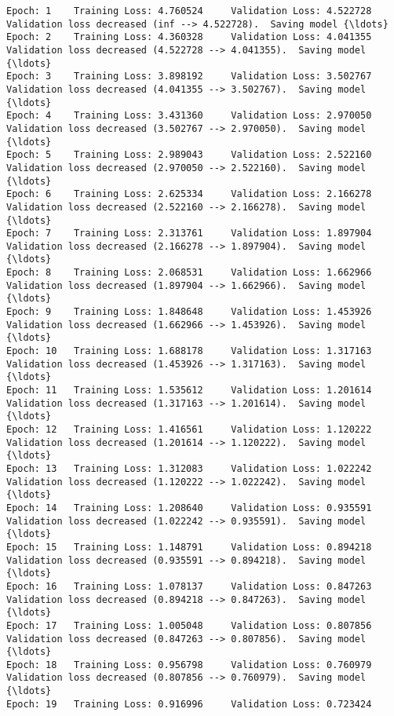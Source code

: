 \documentclass[11pt]{article}
\begin{document}
    \begin{Verbatim}[commandchars=\\\{\}]
Epoch: 1 	Training Loss: 4.760524 	Validation Loss: 4.522728
Validation loss decreased (inf --> 4.522728).  Saving model {\ldots}
Epoch: 2 	Training Loss: 4.360328 	Validation Loss: 4.041355
Validation loss decreased (4.522728 --> 4.041355).  Saving model {\ldots}
Epoch: 3 	Training Loss: 3.898192 	Validation Loss: 3.502767
Validation loss decreased (4.041355 --> 3.502767).  Saving model {\ldots}
Epoch: 4 	Training Loss: 3.431360 	Validation Loss: 2.970050
Validation loss decreased (3.502767 --> 2.970050).  Saving model {\ldots}
Epoch: 5 	Training Loss: 2.989043 	Validation Loss: 2.522160
Validation loss decreased (2.970050 --> 2.522160).  Saving model {\ldots}
Epoch: 6 	Training Loss: 2.625334 	Validation Loss: 2.166278
Validation loss decreased (2.522160 --> 2.166278).  Saving model {\ldots}
Epoch: 7 	Training Loss: 2.313761 	Validation Loss: 1.897904
Validation loss decreased (2.166278 --> 1.897904).  Saving model {\ldots}
Epoch: 8 	Training Loss: 2.068531 	Validation Loss: 1.662966
Validation loss decreased (1.897904 --> 1.662966).  Saving model {\ldots}
Epoch: 9 	Training Loss: 1.848648 	Validation Loss: 1.453926
Validation loss decreased (1.662966 --> 1.453926).  Saving model {\ldots}
Epoch: 10 	Training Loss: 1.688178 	Validation Loss: 1.317163
Validation loss decreased (1.453926 --> 1.317163).  Saving model {\ldots}
Epoch: 11 	Training Loss: 1.535612 	Validation Loss: 1.201614
Validation loss decreased (1.317163 --> 1.201614).  Saving model {\ldots}
Epoch: 12 	Training Loss: 1.416561 	Validation Loss: 1.120222
Validation loss decreased (1.201614 --> 1.120222).  Saving model {\ldots}
Epoch: 13 	Training Loss: 1.312083 	Validation Loss: 1.022242
Validation loss decreased (1.120222 --> 1.022242).  Saving model {\ldots}
Epoch: 14 	Training Loss: 1.208640 	Validation Loss: 0.935591
Validation loss decreased (1.022242 --> 0.935591).  Saving model {\ldots}
Epoch: 15 	Training Loss: 1.148791 	Validation Loss: 0.894218
Validation loss decreased (0.935591 --> 0.894218).  Saving model {\ldots}
Epoch: 16 	Training Loss: 1.078137 	Validation Loss: 0.847263
Validation loss decreased (0.894218 --> 0.847263).  Saving model {\ldots}
Epoch: 17 	Training Loss: 1.005048 	Validation Loss: 0.807856
Validation loss decreased (0.847263 --> 0.807856).  Saving model {\ldots}
Epoch: 18 	Training Loss: 0.956798 	Validation Loss: 0.760979
Validation loss decreased (0.807856 --> 0.760979).  Saving model {\ldots}
Epoch: 19 	Training Loss: 0.916996 	Validation Loss: 0.723424

\end{Verbatim}
\end{document}
